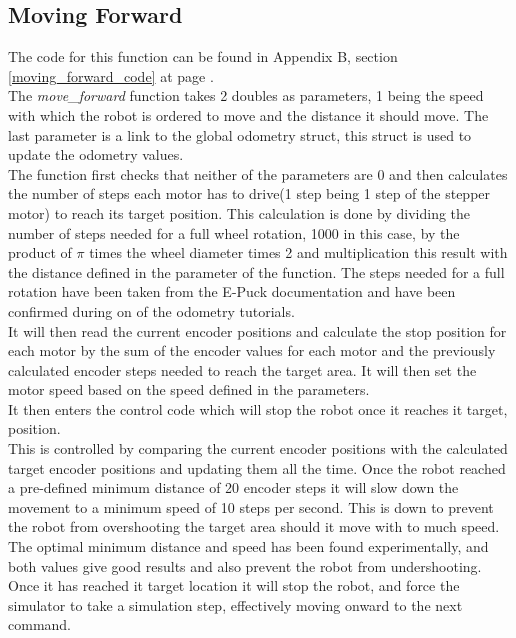 \subsection{Moving Forward}
\label{moving_forward_description}
The code for this function can be found in Appendix B, section \ref{moving_forward_code} at page \pageref{moving_forward_code}.\\
The \textit{move\_forward }function takes 2 doubles as parameters, 1 being the speed with which the robot is ordered to move and the distance it should move. The last parameter is a link to the global odometry struct, this struct is used to update the odometry values.\\
The function first checks that neither of the parameters are 0 and then calculates the number of steps each motor has to drive(1 step being 1 step of the stepper motor) to reach its target position.
This calculation is done by dividing the number of steps needed for a full wheel rotation, 1000 in this case, by the product of $\pi$ times the wheel diameter times 2 and multiplication this result with the distance defined in the parameter of the function. The steps needed for a full rotation have been taken from the E-Puck documentation and have been confirmed during on of the odometry tutorials. \\
It will then read the current encoder positions and calculate the stop position for each motor by the sum of the encoder values for each motor and the previously calculated encoder steps needed to reach the target area. 
It will then set the motor speed based on the speed defined in the parameters.\\[3ex]

It then enters the control code which will stop the robot once it reaches it target, position. \\
This is controlled by comparing the current encoder positions with the calculated target encoder positions and updating them all the time. 
Once the robot reached a pre-defined minimum distance of 20 encoder steps it will slow down the movement to a minimum speed of 10 steps per second. This is down to prevent the robot from overshooting the target area should it move with to much speed. The optimal minimum distance and speed has been found experimentally, and both values give good results and also prevent the robot from undershooting.
Once it has reached it target location it will stop the robot, and force the simulator to take a simulation step, effectively moving onward to the next command.\\[3ex]

